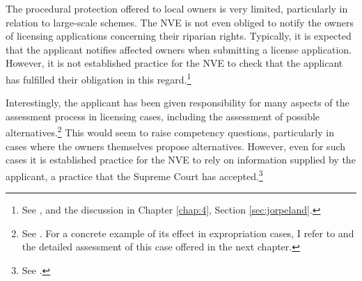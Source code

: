 

The procedural protection offered to local owners is very limited, particularly in relation to large-scale schemes. The NVE is not even obliged to notify the owners of licensing applications concerning their riparian rights. Typically, it is expected that the applicant notifies affected owners when submitting a license application. However, it is not established practice for the NVE to check that the applicant has fulfilled their obligation in this regard.\footnote{See \cite{jorpeland11}, and the discussion in Chapter \ref{chap:4}, Section \ref{sec:jorpeland}.} 

Interestingly, the applicant has been given responsibility for many aspects of the assessment process in licensing cases, including the assessment of possible alternatives.\footnote{See \cite{stokker10}. For a concrete example of its effect in expropriation cases, I refer to \cite{jorpeland11} and the detailed assessment of this case offered in the next chapter.} This would seem to raise competency questions, particularly in cases where the owners themselves propose alternatives.
However, even for such cases it is established practice for the NVE to rely on information supplied by the applicant, a practice that the Supreme Court has accepted.\footnote{See \cite{jorpeland11}.}

